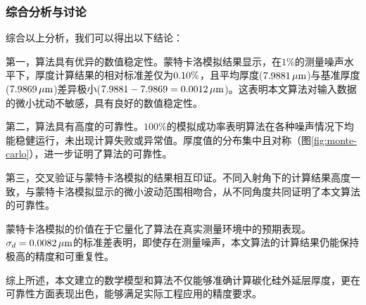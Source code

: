 \documentclass[withoutpreface,bwprint]{cumcmthesis} %
\begin{document}
\subsubsection{综合分析与讨论}

综合以上分析，我们可以得出以下结论：

第一，算法具有优异的数值稳定性。蒙特卡洛模拟结果显示，在$1\%$的测量噪声水平下，厚度计算结果的相对标准差仅为$0.10\%$，且平均厚度($7.9881 \, \mu\text{m}$)与基准厚度($7.9869 \, \mu\text{m}$)差异极小(${7.9881 - 7.9869} = 0.0012 \, \mu\text{m}$)。这表明本文算法对输入数据的微小扰动不敏感，具有良好的数值稳定性。

第二，算法具有高度的可靠性。$100\%$的模拟成功率表明算法在各种噪声情况下均能稳健运行，未出现计算失败或异常值。厚度值的分布集中且对称（图\ref{fig:monte-carlo}），进一步证明了算法的可靠性。

第三，交叉验证与蒙特卡洛模拟的结果相互印证。不同入射角下的计算结果高度一致，与蒙特卡洛模拟显示的微小波动范围相吻合，从不同角度共同证明了本文算法的可靠性。

蒙特卡洛模拟的价值在于它量化了算法在真实测量环境中的预期表现。$\sigma_d = 0.0082 \, \mu\text{m}$的标准差表明，即使存在测量噪声，本文算法的计算结果仍能保持极高的精度和可重复性。

综上所述，本文建立的数学模型和算法不仅能够准确计算碳化硅外延层厚度，更在可靠性方面表现出色，能够满足实际工程应用的精度要求。
\end{document}
